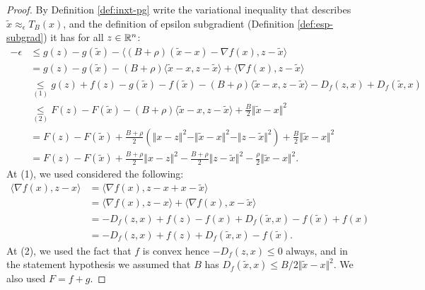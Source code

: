 \documentclass[12pt]{article}
\begin{document}
        \begin{proof}
            By Definition \ref{def:inxt-pg} write the variational inequality that describes $\tilde x \approx_\epsilon T_B(x)$, and the definition of epsilon subgradient (Definition \ref{def:esp-subgrad}) it has for all $z \in \mathbb R^n$: 
            \begin{align*}
                - \epsilon &\le 
                g(z) - g(\tilde x) - \langle (B + \rho)(\tilde x - x) - \nabla f(x), z - \tilde x\rangle
                \\
                &= 
                g(z) - g(\tilde x) 
                - (B + \rho)\langle \tilde x - x, z - \tilde x\rangle
                + \langle \nabla f(x), z - \tilde x\rangle
                \\
                &\underset{(1)}{\le} 
                g(z) + f(z) - g(\tilde x) - f(\tilde x)
                - (B + \rho)\langle \tilde x - x, z - \tilde x\rangle
                - D_f(z, x) + D_f(\tilde x, x)
                \\
                &\underset{(2)}{\le} 
                F(z) - F(\tilde x)
                - (B + \rho)\langle \tilde x - x, z - \tilde x\rangle
                + \frac{B}{2}\Vert \tilde x - x\Vert^2
                \\
                &=
                F(z) - F(\tilde x) + \frac{B + \rho}{2}\left(
                    \Vert x - z\Vert^2
                    - \Vert \tilde x - x\Vert^2
                    - \Vert z - \tilde x\Vert^2
                \right)
                + \frac{B}{2}\Vert \tilde x - x\Vert^2
                \\
                &= 
                F(z) - F(\tilde x)
                + \frac{B + \rho}{2}\Vert x - z\Vert^2
                - \frac{B + \rho}{2}\Vert z - \tilde x\Vert^2
                - \frac{\rho}{2}\Vert \tilde x - x\Vert^2. 
            \end{align*}
            At (1), we used considered the following: 
            \begin{align*}
                \langle \nabla f(x), z - x\rangle &= \langle \nabla f(x), z - x + x - \tilde x\rangle
                \\
                &= \langle \nabla f(x), z - x\rangle + \langle \nabla f(x), x - \tilde x\rangle
                \\
                &= -D_f(z, x) + f(z) - f(x) + D_f(\tilde x, x) - f(\tilde x) + f(x)
                \\
                &= -D_f(z, x) + f(z) + D_f(\tilde x, x) - f(\tilde x). 
            \end{align*}
            At (2), we used the fact that $f$ is convex hence $- D_f(z, x) \le 0$ always, and in the statement hypothesis we assumed that $B$ has $D_f(\tilde x, x) \le B/2\Vert \tilde x - x\Vert^2$. 
            We also used $F = f + g$. 
        \end{proof}
\end{document}
